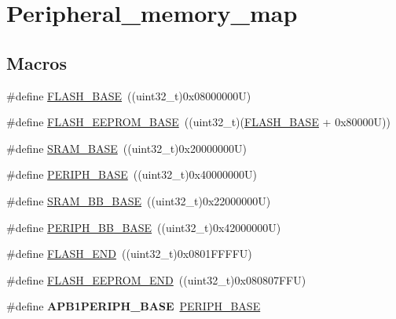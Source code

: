 \hypertarget{group___peripheral__memory__map}{\section{Peripheral\-\_\-memory\-\_\-map}
\label{group___peripheral__memory__map}
}
\subsection*{Macros}
\begin{DoxyCompactItemize}
\item 
\#define \hyperlink{group___peripheral__memory__map_ga23a9099a5f8fc9c6e253c0eecb2be8db}{F\-L\-A\-S\-H\-\_\-\-B\-A\-S\-E}~((uint32\-\_\-t)0x08000000\-U)
\item 
\#define \hyperlink{group___peripheral__memory__map_ga45b9071c81cb72a66e2e3195343fcb3a}{F\-L\-A\-S\-H\-\_\-\-E\-E\-P\-R\-O\-M\-\_\-\-B\-A\-S\-E}~((uint32\-\_\-t)(\hyperlink{group___peripheral__memory__map_ga23a9099a5f8fc9c6e253c0eecb2be8db}{F\-L\-A\-S\-H\-\_\-\-B\-A\-S\-E} + 0x80000\-U))
\item 
\#define \hyperlink{group___peripheral__memory__map_ga05e8f3d2e5868754a7cd88614955aecc}{S\-R\-A\-M\-\_\-\-B\-A\-S\-E}~((uint32\-\_\-t)0x20000000\-U)
\item 
\#define \hyperlink{group___peripheral__memory__map_ga9171f49478fa86d932f89e78e73b88b0}{P\-E\-R\-I\-P\-H\-\_\-\-B\-A\-S\-E}~((uint32\-\_\-t)0x40000000\-U)
\item 
\#define \hyperlink{group___peripheral__memory__map_gad3548b6e2f017f39d399358f3ac98454}{S\-R\-A\-M\-\_\-\-B\-B\-\_\-\-B\-A\-S\-E}~((uint32\-\_\-t)0x22000000\-U)
\item 
\#define \hyperlink{group___peripheral__memory__map_gaed7efc100877000845c236ccdc9e144a}{P\-E\-R\-I\-P\-H\-\_\-\-B\-B\-\_\-\-B\-A\-S\-E}~((uint32\-\_\-t)0x42000000\-U)
\item 
\#define \hyperlink{group___peripheral__memory__map_ga8be554f354e5aa65370f6db63d4f3ee4}{F\-L\-A\-S\-H\-\_\-\-E\-N\-D}~((uint32\-\_\-t)0x0801\-F\-F\-F\-F\-U)
\item 
\#define \hyperlink{group___peripheral__memory__map_gac8cb9b66893a7c4bdff3258909af027a}{F\-L\-A\-S\-H\-\_\-\-E\-E\-P\-R\-O\-M\-\_\-\-E\-N\-D}~((uint32\-\_\-t)0x080807\-F\-F\-U)
\item 
\hypertarget{group___peripheral__memory__map_ga45666d911f39addd4c8c0a0ac3388cfb}{\#define {\bfseries A\-P\-B1\-P\-E\-R\-I\-P\-H\-\_\-\-B\-A\-S\-E}~\hyperlink{group___peripheral__memory__map_ga9171f49478fa86d932f89e78e73b88b0}{P\-E\-R\-I\-P\-H\-\_\-\-B\-A\-S\-E}}\label{group___peripheral__memory__map_ga45666d911f39addd4c8c0a0ac3388cfb}


\end{DoxyCompactItemize}
